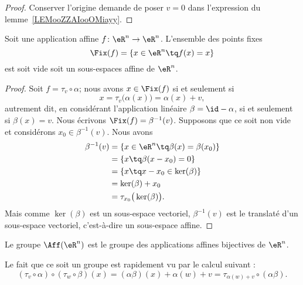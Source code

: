 \begin{proof}
    Conserver l'origine demande de poser \( v=0\) dans l'expression du lemme~\ref{LEMooZZAIooOMiayy}.
\end{proof}

\begin{proposition}     \label{PROPooYRCJooIcmUVI}
    Soit une application affine \( f\colon \eR^n\to \eR^n\). L'ensemble des points fixes
    \begin{equation}
        \Fix(f)=\{ x\in \eR^n\tq f(x)=x \}
    \end{equation}
    est soit vide soit un sous-espaces affine de \( \eR^n\).
\end{proposition}

\begin{proof}
    Soit \( f=\tau_v\circ \alpha\); nous avons \( x\in\Fix(f)\) si et seulement si
    \begin{equation}
        x=\tau_v\big( \alpha(x) \big)=\alpha(x)+v,
    \end{equation}
    autrement dit, en considérant l'application linéaire \( \beta=\id-\alpha\), si et seulement si \( \beta(x)=v\). Nous écrivons \( \Fix(f)=\beta^{-1}(v)\). Supposons que ce soit non vide et considérons \( x_0\in\beta^{-1}(v)\). Nous avons
    \begin{subequations}
        \begin{align}
            \beta^{-1}(v)&=\{ x\in \eR^n\tq \beta(x)=\beta(x_0) \}\\
            &=\{ x\tq \beta(x-x_0)=0 \}\\
            &=\{ x\tq x-x_0\in \ker(\beta) \}\\
            &=\ker(\beta)+x_0\\
            &=\tau_{x_0}\big( \ker(\beta) \big).
        \end{align}
    \end{subequations}
    Mais comme \( \ker(\beta)\) est un sous-espace vectoriel, \( \beta^{-1}(v)\) est le translaté d'un sous-espace vectoriel, c'est-à-dire un sous-espace affine.
\end{proof}

\begin{definition}
    Le groupe \( \Aff(\eR^n)\) est le groupe des applications affines bijectives de \( \eR^n\).
\end{definition}

\begin{remark}
    Le fait que ce soit un groupe est rapidement vu par le calcul suivant :
    \begin{equation}
        (\tau_v\circ\alpha)\circ(\tau_w\circ\beta)(x)=(\alpha\beta)(x)+\alpha(w)+v=\tau_{\alpha(w)+v}\circ(\alpha\beta).
    \end{equation}
\end{remark}

